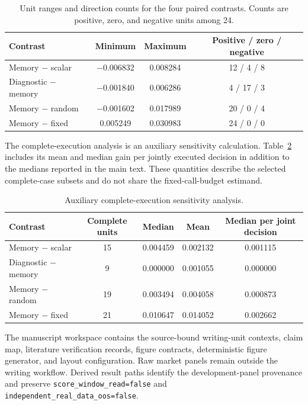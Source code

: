 \begin{table}[!htbp]
\caption{Unit ranges and direction counts for the four paired contrasts. Counts are positive, zero, and negative units among 24.}
\label{tab:ranges}
\centering
\ProjectCaption
\small
\begin{tabular}{lccc}
\toprule
Contrast & Minimum & Maximum & Positive / zero / negative \\
\midrule
Memory $-$ scalar & $-$0.006832 & 0.008284 & 12 / 4 / 8 \\
Diagnostic $-$ memory & $-$0.001840 & 0.006286 & 4 / 17 / 3 \\
Memory $-$ random & $-$0.001602 & 0.017989 & 20 / 0 / 4 \\
Memory $-$ fixed & 0.005249 & 0.030983 & 24 / 0 / 0 \\
\bottomrule
\end{tabular}
\end{table}

The complete-execution analysis is an auxiliary sensitivity calculation. Table~\ref{tab:complete} includes its mean and median gain per jointly executed decision in addition to the medians reported in the main text. These quantities describe the selected complete-case subsets and do not share the fixed-call-budget estimand.

\begin{table}[!htbp]
\caption{Auxiliary complete-execution sensitivity analysis.}
\label{tab:complete}
\centering
\ProjectCaption
\small
\begin{tabular}{lcccc}
\toprule
Contrast & Complete units & Median & Mean & Median per joint decision \\
\midrule
Memory $-$ scalar & 15 & 0.004459 & 0.002132 & 0.001115 \\
Diagnostic $-$ memory & 9 & 0.000000 & 0.001055 & 0.000000 \\
Memory $-$ random & 19 & 0.003494 & 0.004058 & 0.000873 \\
Memory $-$ fixed & 21 & 0.010647 & 0.014052 & 0.002662 \\
\bottomrule
\end{tabular}
\end{table}

The manuscript workspace contains the source-bound writing-unit contexts, claim map, literature verification records, figure contracts, deterministic figure generator, and layout configuration. Raw market panels remain outside the writing workflow. Derived result paths identify the development-panel provenance and preserve \texttt{score\_window\_read=false} and \texttt{independent\_real\_data\_oos=false}.
